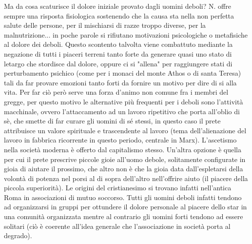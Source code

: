 \documentclass[10pt,a4paper]{article}
\begin{document}
Ma da cosa scaturisce il dolore iniziale provato dagli uomini deboli? N. offre sempre una risposta fisiologica sostenendo che la causa sta nella non perfetta salute delle persone, per il mischiarsi di razze troppo diverse, per la malnutrizione... in poche parole si rifiutano motivazioni psicologiche o metafisiche al dolore dei deboli. Questo scontento talvolta viene combattuto mediante la negazione di tutti i piaceri terreni tanto forte da generare quasi uno stato di letargo che stordisce dal dolore, oppure ci si "allena" per raggiungere stati di perturbamento psichico (come per i monaci del monte Athos o di santa Teresa) tali da far provare emozioni tanto forti da fornire un motivo per dire di si alla vita. Per far ciò però serve una forza d'animo non comune fra i membri del gregge, per questo motivo le alternative più frequenti per i deboli sono l'attività macchinale, ovvero l'attaccamento ad un lavoro ripetitivo che porta all'oblio di sè, che smette di far curare gli uomini di sé stessi, in questo caso il prete attribuisce un valore spirituale e trascendente al lavoro (tema dell'alienazione del lavoro in fabbrica ricorrente in questo periodo, centrale in Marx). L'ascetismo nella società moderna è offerto dal capitalismo stesso. Un'altra opzione è quella per cui il prete prescrive piccole gioie all'uomo debole, solitamente configurate in gioia di aiutare il prossimo, che altro non è che la gioia data dall'espletarsi della volontà di potenza nel porsi al di sopra dell'altro nell'offrire aiuto (il piacere della piccola superiorità). Le origini del cristianesimo si trovano infatti nell'antica Roma in associazioni di mutuo soccorso. Tutti gli uomini deboli infatti tendono ad organizzarsi in gruppi per ottundere il dolore personale al piacere dello star in una comunità organizzata mentre al contrario gli uomini forti tendono ad essere solitari (ciò è coerente all'idea generale che l'associazione in società porta al degrado).\\
\end{document}
